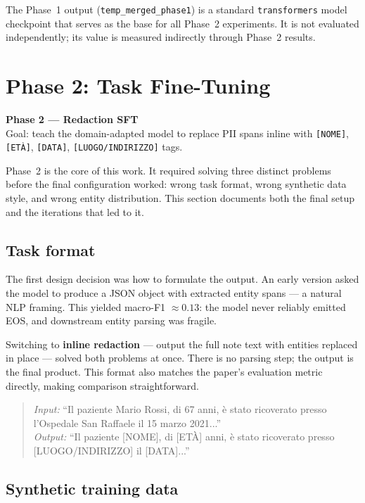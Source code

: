 \documentclass[11pt,a4paper]{article}
\newcommand{\phasetitle}[3]{%
  \vspace{1em}
  \noindent\colorbox{#1!15}{%
    \parbox{\dimexpr\linewidth-2\fboxsep}{%
      \vspace{0.4em}
      {\large\bfseries\color{#1} #2}\\[0.15em]
      {\small\color{#1!80!black} #3}
      \vspace{0.4em}
    }%
  }%
  \vspace{0.5em}
}
\begin{document}
The Phase~1 output (\texttt{temp\_merged\_phase1}) is a standard \texttt{transformers} model checkpoint that serves as the base for all Phase~2 experiments. It is not evaluated independently; its value is measured indirectly through Phase~2 results.

\section{Phase 2: Task Fine-Tuning}
\label{sec:phase2}

\phasetitle{phase2color}{Phase 2 — Redaction SFT}{Goal: teach the domain-adapted model to replace PII spans inline with \texttt{[NOME]}, \texttt{[ETÀ]}, \texttt{[DATA]}, \texttt{[LUOGO/INDIRIZZO]} tags.}

Phase~2 is the core of this work. It required solving three distinct problems before the final configuration worked: wrong task format, wrong synthetic data style, and wrong entity distribution. This section documents both the final setup and the iterations that led to it.

\subsection{Task format}

The first design decision was how to formulate the output. An early version asked the model to produce a JSON object with extracted entity spans — a natural NLP framing. This yielded macro-F1 $\approx 0.13$: the model never reliably emitted EOS, and downstream entity parsing was fragile.

Switching to \textbf{inline redaction} — output the full note text with entities replaced in place — solved both problems at once. There is no parsing step; the output is the final product. This format also matches the paper's evaluation metric directly, making comparison straightforward.

\begin{quote}
\textit{Input:} ``Il paziente Mario Rossi, di 67 anni, è stato ricoverato presso l'Ospedale San Raffaele il 15 marzo 2021...''\\
\textit{Output:} ``Il paziente [NOME], di [ETÀ] anni, è stato ricoverato presso [LUOGO/INDIRIZZO] il [DATA]...''
\end{quote}

\subsection{Synthetic training data}
\label{sec:synth}
\end{document}
